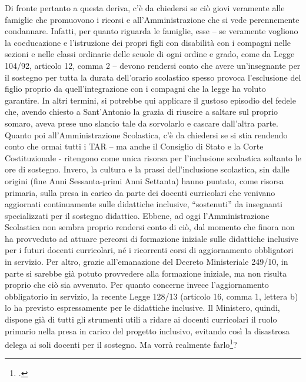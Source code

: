 Di fronte pertanto a questa deriva, c'è da chiedersi se ciò giovi veramente alle famiglie che promuovono i ricorsi e all'Amministrazione che si vede perennemente condannare.
Infatti, per quanto riguarda le famiglie, esse – se veramente vogliono la coeducazione e l'istruzione dei propri figli con disabilità con i compagni nelle sezioni e nelle classi ordinarie delle scuole di ogni ordine e grado, come da Legge 104/92, articolo 12, comma 2 – devono rendersi conto che avere un'insegnante per il sostegno per tutta la durata dell'orario scolastico spesso provoca l'esclusione del figlio proprio da quell'integrazione con i compagni che la legge ha voluto garantire. In altri termini, si potrebbe qui applicare il gustoso episodio del fedele che, avendo chiesto a Sant'Antonio la grazia di riuscire a saltare sul proprio somaro, aveva prese uno slancio tale da sorvolarlo e cascare dall'altra parte.
Quanto poi all'Amministrazione Scolastica, c'è da chiedersi se si stia rendendo conto che ormai tutti i TAR – ma anche il Consiglio di Stato e la Corte Costituzionale - ritengono come unica risorsa per l'inclusione scolastica soltanto le ore di sostegno.
Invero, la cultura e la prassi dell'inclusione scolastica, sin dalle origini (fine Anni Sessanta-primi Anni Settanta) hanno puntato, come risorsa primaria, sulla presa in carico da parte dei docenti curricolari che venivano aggiornati continuamente sulle didattiche inclusive, “sostenuti” da insegnanti specializzati per il sostegno didattico. Ebbene, ad oggi l'Amministrazione Scolastica non sembra proprio rendersi conto di ciò, dal momento che finora non ha provveduto ad attuare percorsi di formazione iniziale sulle didattiche inclusive per i futuri docenti curricolari, né i ricorrenti corsi di aggiornamento obbligatori in servizio.
Per altro, grazie all'emanazione del Decreto Ministeriale 249/10, in parte si sarebbe già potuto provvedere alla formazione iniziale, ma non risulta proprio che ciò sia avvenuto. Per quanto concerne invece l'aggiornamento obbligatorio in servizio, la recente Legge 128/13 (articolo 16, comma 1, lettera b) lo ha previsto espressamente per le didattiche inclusive.
Il Ministero, quindi, dispone già di tutti gli strumenti utili a ridare ai docenti curricolari il ruolo primario nella presa in carico del progetto inclusivo, evitando così la disastrosa delega ai soli docenti per il sostegno. Ma vorrà realmente farlo\footcite{Nocera2014b}?
